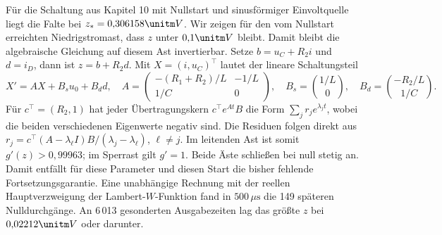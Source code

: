 Für die Schaltung aus Kapitel 10 mit Nullstart und sinusförmiger Einvoltquelle liegt die Falte bei \(z_*=0{,}306158\unitm V\). Wir zeigen für den vom Nullstart erreichten Niedrigstromast, dass \(z\) unter \(0{,}1\unitm V\) bleibt. Damit bleibt die algebraische Gleichung auf diesem Ast invertierbar.
Setze \(b=u_C+R_2i\) und \(d=i_D\), dann ist \(z=b+R_2d\). Mit \(X=(i,u_C)^\top\) lautet der lineare Schaltungsteil
\[
 X'=AX+B_su_0+B_dd,\quad
 A=\begin{pmatrix}-(R_1+R_2)/L&-1/L\\1/C&0\end{pmatrix},
 \quad B_s=\binom{1/L}{0},\quad B_d=\binom{-R_2/L}{1/C}.
\]
Für \(c^\top=(R_2,1)\) hat jeder Übertragungskern \(c^\top e^{At}B\) die Form \(\sum_j r_j e^{\lambda_jt}\), wobei die beiden verschiedenen Eigenwerte negativ sind. Die Residuen folgen direkt aus \(r_j=c^\top(A-\lambda_\ell I)B/(\lambda_j-\lambda_\ell)\), \(\ell\ne j\).
Im leitenden Ast ist somit \(g'(z)>0{,}99963\); im Sperrast gilt \(g'=1\). Beide Äste schließen bei null stetig an. Damit entfällt für diese Parameter und diesen Start die bisher fehlende Fortsetzungsgarantie. Eine unabhängige Rechnung mit der reellen Hauptverzweigung der Lambert-\(W\)-Funktion fand in \(500\,\mu\mathrm s\) die 149 späteren Nulldurchgänge. An 6\,013 gesonderten Ausgabezeiten lag das größte \(z\) bei \(0{,}02212\unitm V\) oder darunter.

